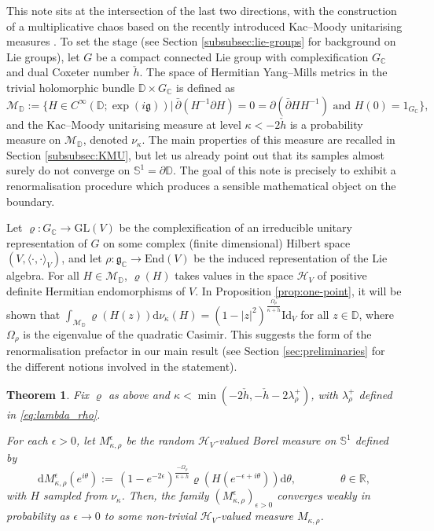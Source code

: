 \documentclass[12pt,a4paper]{amsart}
\numberwithin{equation}{section}
\newtheorem{theorem}{Theorem}[section]
\theoremstyle{remark}
\theoremstyle{definition}
\newcommand{\kg}{\mathfrak g}
\newcommand{\C}{\mathbb C}
\renewcommand{\S}{\mathbb S}
\newcommand{\D}{\mathbb D}
\renewcommand{\d}{\mathrm d}
\newcommand{\del}{\partial}
\newcommand{\R}{\mathbb R}
\newcommand{\delbar}{\bar\partial}
\newcommand{\cM}{\mathcal M}
\newcommand{\cH}{\mathcal{H}}
\begin{document}
This note sits at the intersection of the last two directions, with the construction of a multiplicative chaos based on the recently introduced Kac--Moody unitarising measures \cite{Bav26}. To set the stage (see Section \ref{subsubsec:lie-groups} for background on Lie groups), let $G$ be a compact connected Lie group with complexification $G_\C$ and dual Coxeter number $\check h$. The space of Hermitian Yang--Mills metrics in the trivial holomorphic bundle $\D\times G_\C$ is defined as
\[\cM_\D:=\{H\in C^\infty(\D;\exp(i\kg))|\,\delbar(H^{-1}\del H)=0=\del(\delbar HH^{-1})\text{ and }H(0)=1_{G_\C}\},\]
and the Kac--Moody unitarising measure at level $\kappa<-2\check h$ is a probability measure on $\cM_\D$, denoted $\nu_\kappa$. The main properties of this measure are recalled in Section \ref{subsubsec:KMU}, but let us already point out that its samples almost surely do not converge on $\S^1=\del\D$. The goal of this note is precisely to exhibit a renormalisation procedure which produces a sensible mathematical object on the boundary.


Let $\varrho:G_\C\to\mathrm{GL}(V)$ be the complexification of an irreducible unitary representation of $G$ on some complex (finite dimensional) Hilbert space $(V,\langle\cdot,\cdot\rangle_V)$, and let $\rho:\kg_\C\to\mathrm{End}(V)$ be the induced representation of the Lie algebra. For all $H\in\cM_\D$, $\varrho(H)$ takes values in the space $\cH_V$ of positive definite Hermitian endomorphisms of $V$. In Proposition \ref{prop:one-point}, it will be shown that $\int_{\cM_\D}\varrho(H(z))\d \nu_\kappa(H)=(1-|z|^2)^\frac{\Omega_\rho}{\kappa+\check h}\mathrm{Id}_V$ for all $z\in\D$, where $\Omega_\rho$ is the eigenvalue of the quadratic Casimir. This suggests the form of the renormalisation prefactor in our main result (see Section \ref{sec:preliminaries} for the different notions involved in the statement).

\begin{theorem}\label{thm:convergence}
   Fix $\varrho$ as above and $\kappa<\min(-2\check h,-\check h-2\lambda_\rho^+)$, with $\lambda_\rho^+$ defined in \eqref{eq:lambda_rho}.
   
    For each $\epsilon>0$, let $M_{\kappa,\rho}^\epsilon$ be the random $\cH_V$-valued Borel measure on $\S^1$ defined by 
\begin{equation}\label{eq:def-reg-measure}
\d M^\epsilon_{\kappa,\rho}(e^{i\theta}):=\,(1-e^{-2\epsilon})^\frac{-\Omega_\rho}{\kappa+\check h}\varrho\left(H(e^{-\epsilon+i\theta})\right)\d\theta,\qquad\qquad\theta\in\R,
\end{equation}
with $H$ sampled from $\nu_\kappa$. Then, the family $(M^\epsilon_{\kappa,\rho})_{\epsilon>0}$ converges weakly in probability as $\epsilon\to0$ to some non-trivial $\cH_V$-valued measure $M_{\kappa,\rho}$.
\end{theorem}
\end{document}
